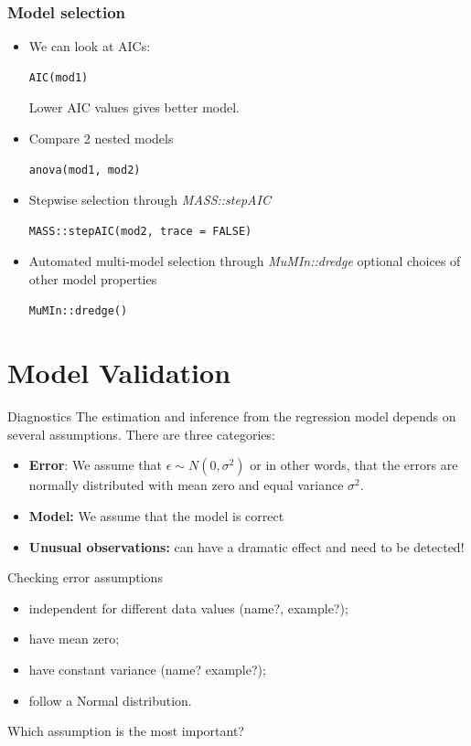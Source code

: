 \documentclass{beamer}
\begin{document}
\begin{frame}[fragile]
\frametitle{Model selection}
\begin{itemize}
\item We can look at AICs:
\begin{lstlisting}
AIC(mod1)
\end{lstlisting}
Lower AIC values gives better model.

\item Compare 2 nested models 
\begin{lstlisting}
anova(mod1, mod2)
\end{lstlisting}

\item Stepwise selection through \textit{MASS::stepAIC}
\begin{lstlisting}
MASS::stepAIC(mod2, trace = FALSE)
\end{lstlisting}

\item  Automated multi-model selection through \textit{MuMIn::dredge}
optional choices of other model properties
\begin{lstlisting}
MuMIn::dredge()
\end{lstlisting}
\end{itemize}
\end{frame}



\section{Model Validation}

\begin{frame}{Diagnostics} 
The estimation and inference from the regression model depends on several assumptions.
There are three categories:
\begin{itemize}
\item \textbf{Error}: 
We assume that $\epsilon \sim N(0, \sigma^{2})$ or in other words, that the errors are normally distributed with mean zero and equal variance $\sigma^2$. 
\item \textbf{Model:} 
We assume that the model is correct

\item \textbf{Unusual observations:} can have a dramatic effect and need to be detected!
\end{itemize}
\end{frame}


\begin{frame}{Checking error assumptions} 
\begin{itemize}
	\item independent for different data values (name?, example?);
	\item have mean zero; 
	\item have constant variance (name? example?);
	\item follow a Normal distribution.
\end{itemize}

\pause
\vspace{1cm}
Which assumption is the most important?
\end{frame}
\end{document}
